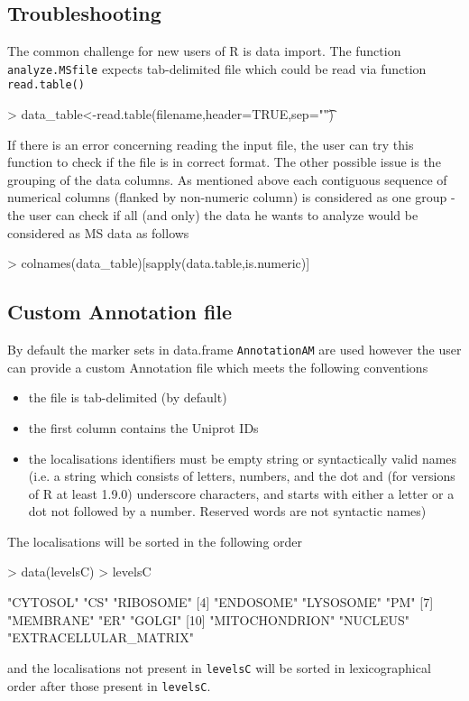 \documentclass[a4paper]{article}
\numberwithin{equation}{subsection}
\begin{document}
\subsection{Troubleshooting}
The common challenge for new users of R is data import. The function
\texttt{analyze.MSfile} expects tab-delimited file which could be
read via function \texttt{read.table()}
\scriptsize
\begin{Schunk}
\begin{Sinput}
> data_table<-read.table(filename,header=TRUE,sep="\t")
\end{Sinput}
\end{Schunk}
\normalsize
If there is an error concerning reading the input file, the user can
try this function to check if the file is in correct format.
The other possible issue is the grouping of the data columns. As
mentioned above each contiguous sequence of numerical columns
(flanked by non-numeric column) is considered as one group - the user
can check if all (and only) the data he wants to analyze would be
considered as MS data as follows
\scriptsize
\begin{Schunk}
\begin{Sinput}
> colnames(data_table)[sapply(data.table,is.numeric)]
\end{Sinput}
\end{Schunk}
\normalsize
\subsection{Custom Annotation file}
By default the marker sets in data.frame \texttt{AnnotationAM} are
used however the user can provide a custom Annotation file which meets
the following conventions

\begin{itemize}
  \item the file is tab-delimited (by default)
  \item the first column contains the Uniprot IDs
    \item the localisations identifiers must be empty string or syntactically valid
      names (i.e. a string which consists of letters, numbers, and the dot and (for versions of R at least 1.9.0) underscore characters, and starts with either a letter or a dot not followed by a number. Reserved words are not syntactic names)
  \end{itemize}
  The localisations will be sorted in the following order
  \scriptsize
\begin{Schunk}
\begin{Sinput}
> data(levelsC)
> levelsC
\end{Sinput}
\begin{Soutput}
 [1] "CYTOSOL"              "CS"                   "RIBOSOME"            
 [4] "ENDOSOME"             "LYSOSOME"             "PM"                  
 [7] "MEMBRANE"             "ER"                   "GOLGI"               
[10] "MITOCHONDRION"        "NUCLEUS"              "EXTRACELLULAR_MATRIX"
\end{Soutput}
\end{Schunk}
\normalsize
and the localisations not present in \texttt{levelsC} will be sorted
  in lexicographical order after those present in \texttt{levelsC}.
\end{document}
